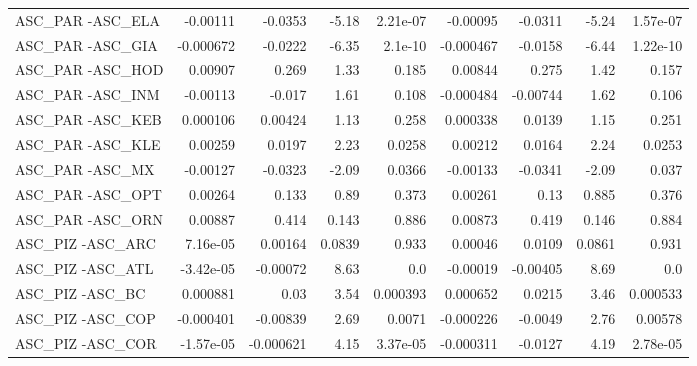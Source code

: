 \begin{tabular}{lrrrrrrrr}
ASC\_PAR -ASC\_ELA                       &    -0.00111 &      -0.0353 &   -5.18 & 2.21e-07 &   -0.00095 &     -0.0311 &        -5.24 &      1.57e-07 \\
ASC\_PAR -ASC\_GIA                       &   -0.000672 &      -0.0222 &   -6.35 &  2.1e-10 &  -0.000467 &     -0.0158 &        -6.44 &      1.22e-10 \\
ASC\_PAR -ASC\_HOD                       &     0.00907 &        0.269 &    1.33 &    0.185 &    0.00844 &       0.275 &         1.42 &         0.157 \\
ASC\_PAR -ASC\_INM                       &    -0.00113 &       -0.017 &    1.61 &    0.108 &  -0.000484 &    -0.00744 &         1.62 &         0.106 \\
ASC\_PAR -ASC\_KEB                       &    0.000106 &      0.00424 &    1.13 &    0.258 &   0.000338 &      0.0139 &         1.15 &         0.251 \\
ASC\_PAR -ASC\_KLE                       &     0.00259 &       0.0197 &    2.23 &   0.0258 &    0.00212 &      0.0164 &         2.24 &        0.0253 \\
ASC\_PAR -ASC\_MX                        &    -0.00127 &      -0.0323 &   -2.09 &   0.0366 &   -0.00133 &     -0.0341 &        -2.09 &         0.037 \\
ASC\_PAR -ASC\_OPT                       &     0.00264 &        0.133 &    0.89 &    0.373 &    0.00261 &        0.13 &        0.885 &         0.376 \\
ASC\_PAR -ASC\_ORN                       &     0.00887 &        0.414 &   0.143 &    0.886 &    0.00873 &       0.419 &        0.146 &         0.884 \\
ASC\_PIZ -ASC\_ARC                       &    7.16e-05 &      0.00164 &  0.0839 &    0.933 &    0.00046 &      0.0109 &       0.0861 &         0.931 \\
ASC\_PIZ -ASC\_ATL                       &   -3.42e-05 &     -0.00072 &    8.63 &      0.0 &   -0.00019 &    -0.00405 &         8.69 &           0.0 \\
ASC\_PIZ -ASC\_BC                        &    0.000881 &         0.03 &    3.54 & 0.000393 &   0.000652 &      0.0215 &         3.46 &      0.000533 \\
ASC\_PIZ -ASC\_COP                       &   -0.000401 &     -0.00839 &    2.69 &   0.0071 &  -0.000226 &     -0.0049 &         2.76 &       0.00578 \\
ASC\_PIZ -ASC\_COR                       &   -1.57e-05 &    -0.000621 &    4.15 & 3.37e-05 &  -0.000311 &     -0.0127 &         4.19 &      2.78e-05 \\

\end{tabular}
